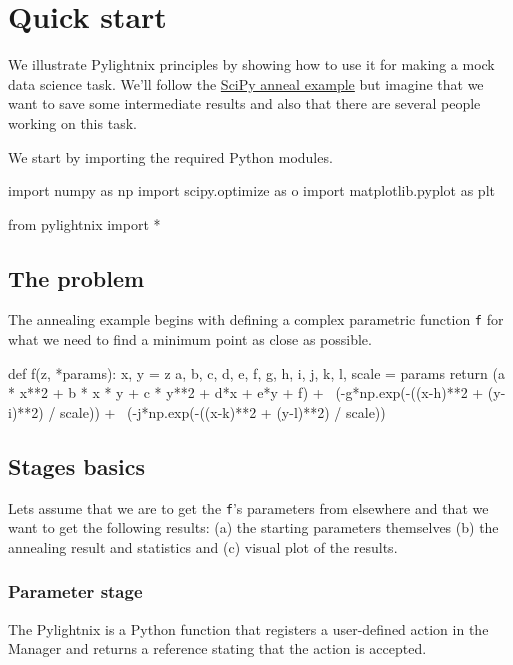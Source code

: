 \section{Quick start}

We illustrate Pylightnix principles by showing how to use it for making a mock
data science task. We'll follow the
\href{https://docs.scipy.org/doc/scipy/reference/generated/scipy.optimize.dual_annealing.html}{SciPy
anneal example} but imagine that we want to save some intermediate results and
also that there are several people working on this task.

We start by importing the required Python modules.

\begin{pythontexcode}
import numpy as np
import scipy.optimize as o
import matplotlib.pyplot as plt

from pylightnix import *
\end{pythontexcode}

\subsection{The problem}

The annealing example begins with defining a complex parametric function
\texttt{f} for what we need to find a minimum point as close as possible.

\begin{pythontexcode}
def f(z, *params):
    x, y = z
    a, b, c, d, e, f, g, h, i, j, k, l, scale = params
    return (a * x**2 + b * x * y + c * y**2 + d*x + e*y + f) + \
           (-g*np.exp(-((x-h)**2 + (y-i)**2) / scale)) + \
           (-j*np.exp(-((x-k)**2 + (y-l)**2) / scale))
\end{pythontexcode}

\subsection{Stages basics}

Lets assume that we are to get the \texttt{f}'s parameters from elsewhere and
that we want to get the following results: (a) the starting parameters
themselves (b) the annealing result and statistics and (c) visual plot of the
results.

\subsubsection{Parameter stage}

The Pylightnix  is a Python function that
registers a user-defined action in the Manager and returns a
\pref{DRef}{pylightnix.types.DRef} reference stating that the action is
accepted.


